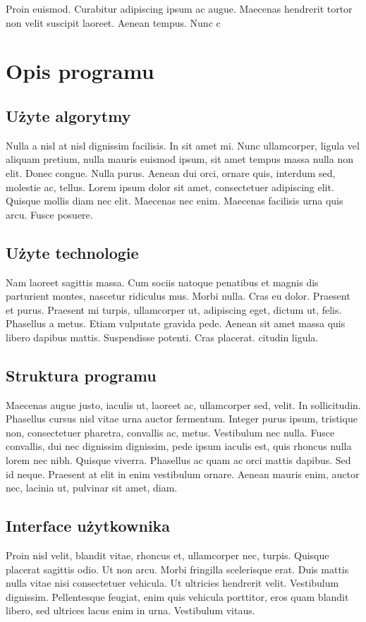 \documentclass[eng,printmode]{mgr}
\begin{document}
Proin euismod. Curabitur adipiscing ipsum ac augue. Maecenas hendrerit tortor non velit suscipit laoreet. Aenean tempus. Nunc c

\chapter{Opis programu}
\section{Użyte algorytmy}
Nulla a nisl at nisl dignissim facilisis. In sit amet mi. Nunc ullamcorper, ligula vel aliquam pretium, nulla mauris euismod ipsum, sit amet tempus massa nulla non elit. Donec congue. Nulla purus. Aenean dui orci, ornare quis, interdum sed, molestie ac, tellus. Lorem ipsum dolor sit amet, consectetuer adipiscing elit. Quisque mollis diam nec elit. Maecenas nec enim. Maecenas facilisis urna quis arcu. Fusce posuere.

\section{Użyte technologie}
Nam laoreet sagittis massa. Cum sociis natoque penatibus et magnis dis parturient montes, nascetur ridiculus mus. Morbi nulla. Cras eu dolor. Praesent et purus. Praesent mi turpis, ullamcorper ut, adipiscing eget, dictum ut, felis. Phasellus a metus. Etiam vulputate gravida pede. Aenean sit amet massa quis libero dapibus mattis. Suspendisse potenti. Cras placerat.
citudin ligula.

\section{Struktura programu}
Maecenas augue justo, iaculis ut, laoreet ac, ullamcorper sed, velit. In sollicitudin. Phasellus cursus nisl vitae urna auctor fermentum. Integer purus ipsum, tristique non, consectetuer pharetra, convallis ac, metus. Vestibulum nec nulla. Fusce convallis, dui nec dignissim dignissim, pede ipsum iaculis est, quis rhoncus nulla lorem nec nibh. Quisque viverra. Phasellus ac quam ac orci mattis dapibus. Sed id neque. Praesent at elit in enim vestibulum ornare. Aenean mauris enim, auctor nec, lacinia ut, pulvinar sit amet, diam.

\section{Interface użytkownika}
Proin nisl velit, blandit vitae, rhoncus et, ullamcorper nec, turpis. Quisque placerat sagittis odio. Ut non arcu. Morbi fringilla scelerisque erat. Duis mattis nulla vitae nisi consectetuer vehicula. Ut ultricies hendrerit velit. Vestibulum dignissim. Pellentesque feugiat, enim quis vehicula porttitor, eros quam blandit libero, sed ultrices lacus enim in urna. Vestibulum vitaus.
\end{document}
